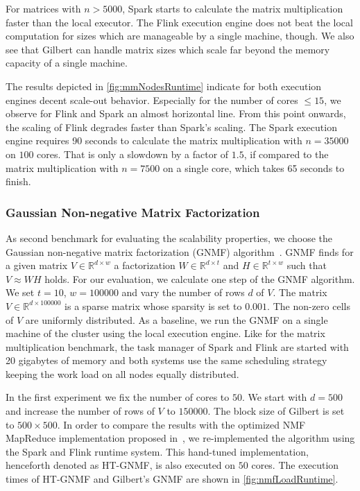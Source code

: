 For matrices with $n>5000$, Spark starts to calculate the matrix multiplication faster than the local executor.
The Flink execution engine does not beat the local computation for sizes which are manageable by a single machine, though.
We also see that Gilbert can handle matrix sizes which scale far beyond the memory capacity of a single machine.

The results depicted in \cref{fig:mmNodesRuntime} indicate for both execution engines decent scale-out behavior.
Especially for the number of cores $\le 15$, we observe for Flink and Spark an almost horizontal line.
From this point onwards, the scaling of Flink degrades faster than Spark's scaling.
The Spark execution engine requires 90 seconds to calculate the matrix multiplication with $n=35000$ on $100$ cores.
That is only a slowdown by a factor of $1.5$, if compared to the matrix multiplication with $n=7500$ on a single core, which takes 65 seconds to finish.

\subsubsection{Gaussian Non-negative Matrix Factorization}
\label{subsec:NMF}

As second benchmark for evaluating the scalability properties, we choose the Gaussian non-negative matrix factorization (GNMF) algorithm~\cite{seung:anips2001a}.
GNMF finds for a given matrix $V \in \mathbb{R}^{d\times w}$ a factorization $W \in \mathbb{R}^{d\times t}$ and $H \in \mathbb{R}^{t\times w}$ such that $V\approx W H$ holds.
For our evaluation, we calculate one step of the GNMF algorithm.
We set $t=10$, $w=100000$ and vary the number of rows $d$ of $V$.
The matrix $V\in\mathbb{R}^{d\times 100000}$ is a sparse matrix whose sparsity is set to $0.001$.
The non-zero cells of $V$ are uniformly distributed.
As a baseline, we run the GNMF on a single machine of the cluster using the local execution engine.
Like for the matrix multiplication benchmark, the task manager of Spark and Flink are started with 20 gigabytes of memory and both systems use the same scheduling strategy keeping the work load on all nodes equally distributed.

In the first experiment we fix the number of cores to $50$.
We start with $d=500$ and increase the number of rows of $V$ to $150000$.
The block size of Gilbert is set to $500 \times 500$.
In order to compare the results with the optimized NMF MapReduce implementation proposed in~\cite{liu:2010a}, we re-implemented the algorithm using the Spark and Flink runtime system.
This hand-tuned implementation, henceforth denoted as HT-GNMF, is also executed on $50$ cores.
The execution times of HT-GNMF and Gilbert's GNMF are shown in \cref{fig:nmfLoadRuntime}.

